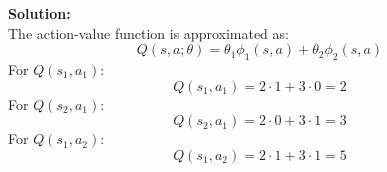 \documentclass{article}
\begin{document}
\begin{enumerate}[label=Q\arabic*.]
\textbf{Solution:} \\
The action-value function is approximated as:
\[
Q(s, a; \theta) = \theta_1 \phi_1(s, a) + \theta_2 \phi_2(s, a)
\]
For $Q(s_1, a_1)$:
\[
Q(s_1, a_1) = 2 \cdot 1 + 3 \cdot 0 = 2
\]
For $Q(s_2, a_1)$:
\[
Q(s_2, a_1) = 2 \cdot 0 + 3 \cdot 1 = 3
\]
For $Q(s_1, a_2)$:
\[
Q(s_1, a_2) = 2 \cdot 1 + 3 \cdot 1 = 5
\]

\end{enumerate}
\end{document}
